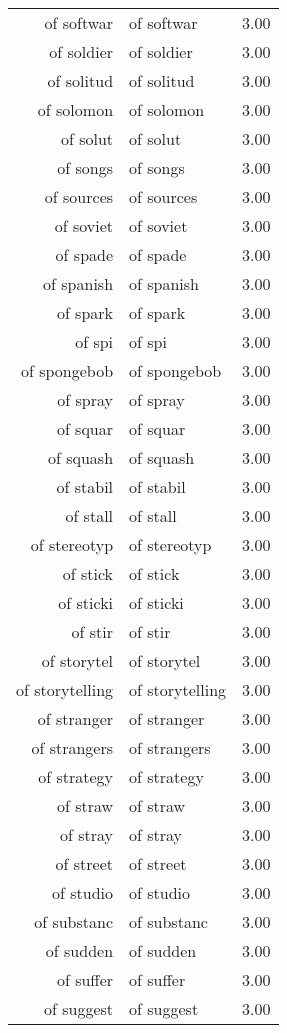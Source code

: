 \begin{table}[ht]
\begin{tabular}{rlr}
  of softwar & of softwar & 3.00 \\ 
  of soldier & of soldier & 3.00 \\ 
  of solitud & of solitud & 3.00 \\ 
  of solomon & of solomon & 3.00 \\ 
  of solut & of solut & 3.00 \\ 
  of songs & of songs & 3.00 \\ 
  of sources & of sources & 3.00 \\ 
  of soviet & of soviet & 3.00 \\ 
  of spade & of spade & 3.00 \\ 
  of spanish & of spanish & 3.00 \\ 
  of spark & of spark & 3.00 \\ 
  of spi & of spi & 3.00 \\ 
  of spongebob & of spongebob & 3.00 \\ 
  of spray & of spray & 3.00 \\ 
  of squar & of squar & 3.00 \\ 
  of squash & of squash & 3.00 \\ 
  of stabil & of stabil & 3.00 \\ 
  of stall & of stall & 3.00 \\ 
  of stereotyp & of stereotyp & 3.00 \\ 
  of stick & of stick & 3.00 \\ 
  of sticki & of sticki & 3.00 \\ 
  of stir & of stir & 3.00 \\ 
  of storytel & of storytel & 3.00 \\ 
  of storytelling & of storytelling & 3.00 \\ 
  of stranger & of stranger & 3.00 \\ 
  of strangers & of strangers & 3.00 \\ 
  of strategy & of strategy & 3.00 \\ 
  of straw & of straw & 3.00 \\ 
  of stray & of stray & 3.00 \\ 
  of street & of street & 3.00 \\ 
  of studio & of studio & 3.00 \\ 
  of substanc & of substanc & 3.00 \\ 
  of sudden & of sudden & 3.00 \\ 
  of suffer & of suffer & 3.00 \\ 
  of suggest & of suggest & 3.00 \\ 

\end{tabular}
\end{table}
